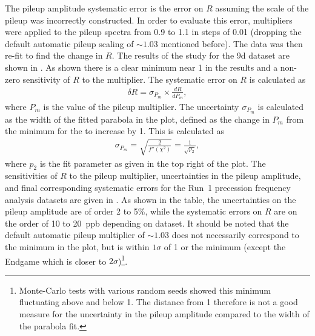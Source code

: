 The pileup amplitude systematic error is the error on $R$ assuming the scale of the pileup was incorrectly constructed. In order to evaluate this error, multipliers were applied to the pileup spectra from 0.9 to 1.1 in steps of 0.01 (dropping the default automatic pileup scaling of $\sim1.03$ mentioned before). The data was then re-fit to find the change in $R$. The results of the study for the 9d dataset are shown in . As shown there is a clear minimum near 1 in the \chisq results and a non-zero sensitivity of $R$ to the multiplier. The systematic error on $R$ is calculated as 
    \begin{align}
        \delta R = \sigma_{P_{m}} \times \frac{dR}{dP_{m}},
    \end{align}
where $P_{m}$ is the value of the pileup multiplier. The uncertainty $\sigma_{P_{m}}$ is calculated as the width of the fitted parabola in the \chisq plot, defined as the change in $P_{m}$ from the minimum for the \chisq to increase by 1. This is calculated as 
    \begin{align}
        \sigma_{P_{m}} = \sqrt{\frac{2}{f''(\chi^{2})}} = \frac{1}{\sqrt{p_{2}}},
    \end{align}
where $p_{2}$ is the fit parameter as given in the top right of the \chisq plot. The sensitivities of $R$ to the pileup multiplier, uncertainties in the pileup amplitude, and final corresponding systematic errors for the Run~1 precession frequency analysis datasets are given in . As shown in the table, the uncertainties on the pileup amplitude are of order 2 to 5\%, while the systematic errors on $R$ are on the order of \SI{10}{} to \SI{20}{ppb} depending on dataset.  It should be noted that the default automatic pileup multiplier of $\sim1.03$ does not necessarily correspond to the minimum in the \chisq plot, but is within $1\sigma$ of 1 or the minimum (except the Endgame which is closer to $2\sigma$)\footnote{Monte-Carlo tests with various random seeds showed this minimum fluctuating above and below 1. The distance from 1 therefore is not a good measure for the uncertainty in the pileup amplitude compared to the width of the \chisq parabola fit.}.


